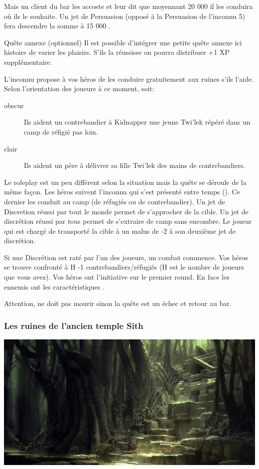 Mais un client du bar les accoste et leur dit que moyennant 20 000 \crg il les conduira où ils le souhaite. Un jet de Persuasion (opposé à la Persuasion de l’inconnu 5) fera descendre la somme à 15 000 \crg.

\begin{paperbox}{Quête annexe (optionnel)}
    Il est possible d'intégrer une petite quête annexe ici histoire de varier les plaisirs. S'ils la réussisse on pourra distribuer +1 XP supplémentaire.

    L'inconnu propose à vos héros de les conduire gratuitement aux ruines s'ils l'aide. Selon l'orientation des joueurs à ce moment, soit:
    \begin{description}
        \item [obscur] Ils aident un contrebandier à Kidnapper une jeune Twi'lek répéré dans un camp de réfigié pas loin.
        \item [clair] Ils aident un père à délivrer sa fille Twi'lek des mains de contrebandiers.
    \end{description}

    Le roleplay est un peu différent selon la situation mais la quête se déroule de la même façon. Les héros suivent l'inconnu qui s'est présenté entre temps (). Ce dernier les conduit au camp (de réfugiés ou de contrebandier). Un jet de Discretion réussi par tout le monde permet de s'approcher de la cible. Un jet de discrétion réussi par tous permet de s'extraire de camp sans encombre. Le joueur qui est chargé de transporté la cible à un malus de -2 à son deuxième jet de discrétion.

    Si une Discrétion est raté par l'un des joueurs, un combat commence. Vos héros se trouve confronté à H -1 contrebandiers/réfugiés (H est le nombre de joueurs que vous avez). Vos héros ont l'initiative sur le premier round. En face les ennemis ont les caractéristiques .

    Attention,  ne doit pas mourir sinon la quête est un échec et retour au bar. 
\end{paperbox}

\subsubsection{Les ruines de l'ancien temple Sith}
\noindent\includegraphics[width=\linewidth]{_img/dos-au-muur/taris-temple-sith.png}

